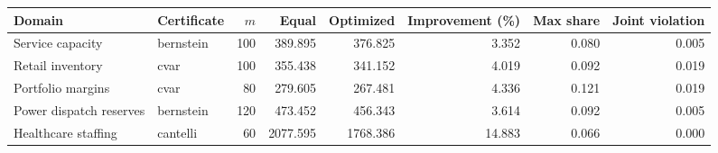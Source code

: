 \begin{tabular}{llrrrrrr}
\toprule
Domain & Certificate & $m$ & Equal & Optimized & Improvement (\%) & Max share & Joint violation \\
\midrule
Service capacity & bernstein & 100 & 389.895 & 376.825 & 3.352 & 0.080 & 0.005 \\
Retail inventory & cvar & 100 & 355.438 & 341.152 & 4.019 & 0.092 & 0.019 \\
Portfolio margins & cvar & 80 & 279.605 & 267.481 & 4.336 & 0.121 & 0.019 \\
Power dispatch reserves & bernstein & 120 & 473.452 & 456.343 & 3.614 & 0.092 & 0.005 \\
Healthcare staffing & cantelli & 60 & 2077.595 & 1768.386 & 14.883 & 0.066 & 0.000 \\
\bottomrule
\end{tabular}
